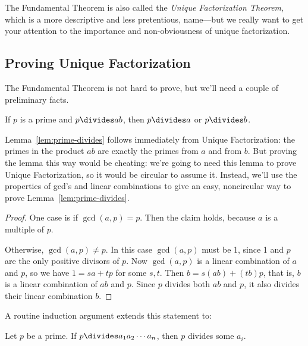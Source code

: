 The Fundamental Theorem is also called the \emph{Unique Factorization
  Theorem}, which is a more descriptive and less pretentious,
name---but we really want to get your attention to the importance and
non-obviousness of unique factorization.

\subsection{Proving Unique Factorization}

The Fundamental Theorem is not hard to prove, but we'll need a couple
of preliminary facts.

\begin{lemma}
\label{lem:prime-divides}
If $p$ is a prime and $p \divides ab$, then $p \divides a$ or $p
\divides b$.
\end{lemma}

Lemma~\ref{lem:prime-divides} follows immediately from Unique
Factorization: the primes in the product $ab$ are exactly the primes
from $a$ and from $b$.  But proving the lemma this way would be
cheating: we're going to need this lemma to prove Unique
Factorization, so it would be circular to assume it.  Instead, we'll
use the properties of gcd's and linear combinations to give an easy,
noncircular way to prove Lemma~\ref{lem:prime-divides}.

\begin{proof}
One case is if $\gcd(a, p) = p$.  Then the claim holds, because $a$ is
a multiple of $p$.

Otherwise, $\gcd(a, p) \neq p$.  In this case $\gcd(a, p)$ must be 1,
since 1 and $p$ are the only positive divisors of $p$.  Now $\gcd(a,
p)$ is a linear combination of $a$ and $p$, so we have $1=sa+tp$ for
some $s,t$.  Then $b =s(ab)+ (tb)p$, that is, $b$ is a linear
combination of $ab$ and $p$.  Since $p$ divides both $ab$ and $p$, it
also divides their linear combination $b$.
\end{proof}

A routine induction argument extends this statement to:\iffalse the
fact we assumed last time:\fi

\begin{lemma}
\label{lem:prime-divides-ind}
Let $p$ be a prime.  If $p \divides a_1 a_2 \cdots a_n$, then $p$
divides some $a_i$.
\end{lemma}

